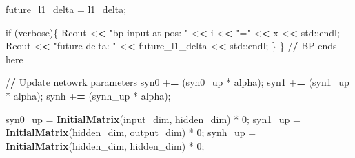 \documentclass[]{article}
\newenvironment{Shaded}{\begin{snugshade}}{\end{snugshade}}
\newcommand{\KeywordTok}[1]{\textcolor[rgb]{0.13,0.29,0.53}{\textbf{{#1}}}}
\newcommand{\DecValTok}[1]{\textcolor[rgb]{0.00,0.00,0.81}{{#1}}}
\newcommand{\StringTok}[1]{\textcolor[rgb]{0.31,0.60,0.02}{{#1}}}
\newcommand{\ErrorTok}[1]{\textcolor[rgb]{0.64,0.00,0.00}{\textbf{{#1}}}}
\newcommand{\NormalTok}[1]{{#1}}
\begin{document}
\begin{Shaded}
\begin{Highlighting}[]
{{      \NormalTok{future_l1_delta =}\StringTok{ }\NormalTok{l1_delta;}

      \NormalTok{if (verbose)\{}
        \NormalTok{Rcout <}\ErrorTok{<}\StringTok{ "bp input at pos: "} \NormalTok{<}\ErrorTok{<}\StringTok{ }\NormalTok{i <}\ErrorTok{<}\StringTok{ "="} \NormalTok{<}\ErrorTok{<}\StringTok{ }\NormalTok{x <}\ErrorTok{<}\StringTok{ }\NormalTok{std::endl;}
        \NormalTok{Rcout <}\ErrorTok{<}\StringTok{ "future delta: "} \NormalTok{<}\ErrorTok{<}\StringTok{ }\NormalTok{future_l1_delta <}\ErrorTok{<}\StringTok{ }\NormalTok{std::endl;}
      \NormalTok{\}}
    \NormalTok{\}}
    \NormalTok{/}\ErrorTok{/}\StringTok{ }\NormalTok{BP ends here}

    \NormalTok{/}\ErrorTok{/}\StringTok{ }\NormalTok{Update netowrk parameters}
    \NormalTok{syn0 +}\ErrorTok{=}\StringTok{ }\NormalTok{(syn0_up *}\StringTok{ }\NormalTok{alpha);}
    \NormalTok{syn1 +}\ErrorTok{=}\StringTok{ }\NormalTok{(syn1_up *}\StringTok{ }\NormalTok{alpha);}
    \NormalTok{synh +}\ErrorTok{=}\StringTok{ }\NormalTok{(synh_up *}\StringTok{ }\NormalTok{alpha);}

    \NormalTok{syn0_up =}\StringTok{ }\KeywordTok{InitialMatrix}\NormalTok{(input_dim, hidden_dim) *}\StringTok{ }\DecValTok{0}\NormalTok{;}
    \NormalTok{syn1_up =}\StringTok{ }\KeywordTok{InitialMatrix}\NormalTok{(hidden_dim, output_dim) *}\StringTok{ }\DecValTok{0}\NormalTok{;}
    \NormalTok{synh_up =}\StringTok{ }\KeywordTok{InitialMatrix}\NormalTok{(hidden_dim, hidden_dim) *}\StringTok{ }\DecValTok{0}\NormalTok{;}

}}
\end{Highlighting}
\end{Shaded}
\end{document}
